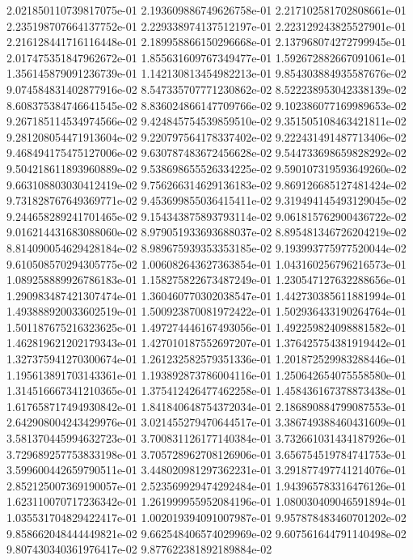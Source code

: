 2.021850110739817075e-01
2.193609886749626758e-01
2.217102581702808661e-01
2.235198707664137752e-01
2.229338974137512197e-01
2.223129243825527901e-01
2.216128441716116448e-01
2.189958866150296668e-01
2.137968074272799945e-01
2.017475351847962672e-01
1.855631609767349477e-01
1.592672882667091061e-01
1.356145879091236739e-01
1.142130813454982213e-01
9.854303884935587676e-02
9.074584831402877916e-02
8.547335707771230862e-02
8.522238953042338139e-02
8.608375384746641545e-02
8.836024866147709766e-02
9.102386077169989653e-02
9.267185114534974566e-02
9.424845754539859510e-02
9.351505108463421811e-02
9.281208054471913604e-02
9.220797564178337402e-02
9.222431491487713406e-02
9.468494175475127006e-02
9.630787483672456628e-02
9.544733698659828292e-02
9.504218611893960889e-02
9.538698655526334225e-02
9.590107319593649260e-02
9.663108803030412419e-02
9.756266314629136183e-02
9.869126685127481424e-02
9.731828767649369771e-02
9.453699855036415411e-02
9.319494145493129045e-02
9.244658289241701465e-02
9.154343875893793114e-02
9.061815762900436722e-02
9.016214431683088060e-02
8.979051933693688037e-02
8.895481346726204219e-02
8.814090054629428184e-02
8.989675939353353185e-02
9.193993775977520044e-02
9.610508570294305775e-02
1.006082643627363854e-01
1.043160256796216573e-01
1.089258889926786183e-01
1.158275822673487249e-01
1.230547127632288656e-01
1.290983487421307474e-01
1.360460770302038547e-01
1.442730385611881994e-01
1.493888920033602519e-01
1.500923870081972422e-01
1.502936433190264764e-01
1.501187675216323625e-01
1.497274446167493056e-01
1.492259824098881582e-01
1.462819621202179343e-01
1.427010187552697207e-01
1.376425754381919442e-01
1.327375941270300674e-01
1.261232582579351336e-01
1.201872529983288446e-01
1.195613891703143361e-01
1.193892873786004116e-01
1.250642654075558580e-01
1.314516667341210365e-01
1.375412426477462258e-01
1.458436167378873438e-01
1.617658717494930842e-01
1.841840648754372034e-01
2.186890884799087553e-01
2.642908004243429976e-01
3.021455279470644517e-01
3.386749388460431609e-01
3.581370445994632723e-01
3.700831126177140384e-01
3.732661031434187926e-01
3.729689257753833198e-01
3.705728962708126906e-01
3.656754519784741753e-01
3.599600442659790511e-01
3.448020981297362231e-01
3.291877497741214076e-01
2.852125007369190057e-01
2.523569929474292484e-01
1.943965783316476126e-01
1.623110070717236342e-01
1.261999955952084196e-01
1.080030409046591894e-01
1.035531704829422417e-01
1.002019394091007987e-01
9.957878483460701202e-02
9.858662048444449821e-02
9.662548406574029969e-02
9.607561644791140498e-02
9.807430340361976417e-02
9.877622381892189884e-02
